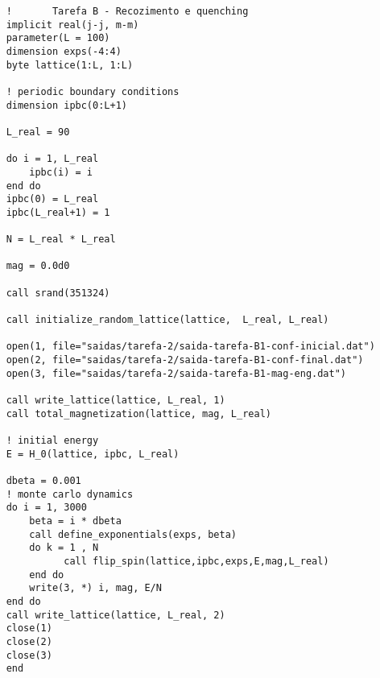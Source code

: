 
\begin{verbatim}
    !       Tarefa B - Recozimento e quenching
    implicit real(j-j, m-m)
    parameter(L = 100)
    dimension exps(-4:4)
    byte lattice(1:L, 1:L)

    ! periodic boundary conditions
    dimension ipbc(0:L+1)

    L_real = 90

    do i = 1, L_real
        ipbc(i) = i
    end do  
    ipbc(0) = L_real
    ipbc(L_real+1) = 1

    N = L_real * L_real

    mag = 0.0d0

    call srand(351324)

    call initialize_random_lattice(lattice,  L_real, L_real)

    open(1, file="saidas/tarefa-2/saida-tarefa-B1-conf-inicial.dat")
    open(2, file="saidas/tarefa-2/saida-tarefa-B1-conf-final.dat")
    open(3, file="saidas/tarefa-2/saida-tarefa-B1-mag-eng.dat")

    call write_lattice(lattice, L_real, 1) 
    call total_magnetization(lattice, mag, L_real)

    ! initial energy
    E = H_0(lattice, ipbc, L_real)

    dbeta = 0.001
    ! monte carlo dynamics
    do i = 1, 3000
        beta = i * dbeta
        call define_exponentials(exps, beta)
        do k = 1 , N
              call flip_spin(lattice,ipbc,exps,E,mag,L_real)
        end do   
        write(3, *) i, mag, E/N
    end do
    call write_lattice(lattice, L_real, 2) 
    close(1)
    close(2)
    close(3)
    end
\end{verbatim}
